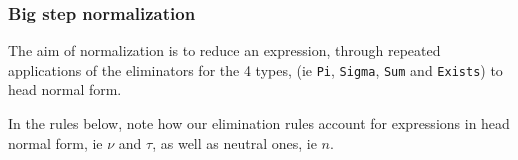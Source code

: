 \documentclass{article}
\begin{document}
\subsubsection{Big step normalization}

The aim of normalization is to reduce an
expression, through repeated applications of the eliminators for the 4 types,
(ie \verb|Pi|, \verb|Sigma|, \verb|Sum| and \verb|Exists|) to head normal 
form.



In the rules below, note how our elimination rules account for expressions
in head normal form, ie $\nu$ and $\tau$, as well as neutral ones, ie $n$.


\end{document}
